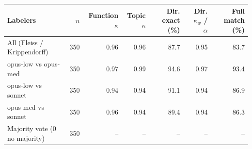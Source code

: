 \begin{tabular}{lrrrrrr}
\toprule
Labelers & $n$ & Function $\kappa$ & Topic $\kappa$ & Dir. exact (\%) & Dir. $\kappa_w$ / $\alpha$ & Full match (\%) \\
\midrule
All (Fleiss / Krippendorff) & 350 & 0.96 & 0.96 & 87.7 & 0.95 & 83.7 \\
opus-low vs opus-med & 350 & 0.97 & 0.99 & 94.6 & 0.97 & 93.4 \\
opus-low vs sonnet & 350 & 0.94 & 0.94 & 91.1 & 0.94 & 86.9 \\
opus-med vs sonnet & 350 & 0.96 & 0.94 & 89.4 & 0.94 & 86.3 \\
Majority vote (0 no majority) & 350 & -- & -- & -- & -- & -- \\
\bottomrule
\end{tabular}
